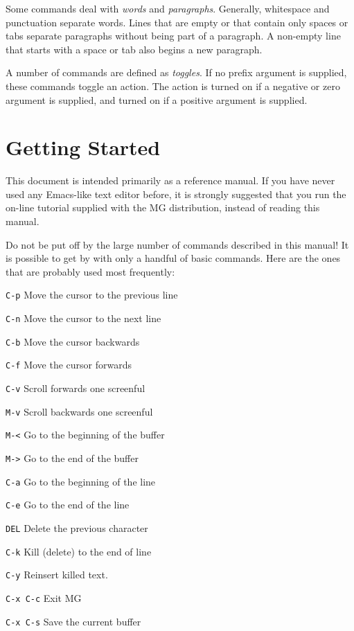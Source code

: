 Some commands deal with {\em words\/} and {\em paragraphs\/}.
Generally, whitespace and punctuation separate words.  Lines that are
empty or that contain only spaces or tabs separate paragraphs without
being part of a paragraph.  A non-empty line that starts with a space
or tab also begins a new paragraph. 

A number of commands are defined as {\em toggles\/}.  If no prefix argument
is supplied, these commands toggle an action.  The action is turned on if a 
negative or zero argument is supplied, and turned on if a positive argument
is supplied.

\section{Getting Started}

This document is intended primarily as a reference manual.  If you
have never used any Emacs-like text editor before, it is strongly
suggested that you run the on-line tutorial supplied with the MG
distribution, instead of reading this manual.

Do not be put off by the large number of commands described in this
manual!  It is possible to get by with only a handful of basic commands.
Here are the ones that are probably used most frequently:

\begin{define}{\hspace{1in}}
\item[{\tt C-p}\hfill] Move the cursor to the previous line
\item[{\tt C-n}\hfill] Move the cursor to the next line
\item[{\tt C-b}\hfill] Move the cursor backwards
\item[{\tt C-f}\hfill] Move the cursor forwards
\item[{\tt C-v}\hfill] Scroll forwards one screenful
\item[{\tt M-v}\hfill] Scroll backwards one screenful
\item[{\tt M-<}\hfill] Go to the beginning of the buffer
\item[{\tt M->}\hfill] Go to the end of the buffer
\item[{\tt C-a}\hfill] Go to the beginning of the line
\item[{\tt C-e}\hfill] Go to the end of the line
\item[{\tt DEL}\hfill] Delete the previous character
\item[{\tt C-k}\hfill] Kill (delete) to the end of line
\item[{\tt C-y}\hfill] Reinsert killed text.
\item[{\tt C-x C-c}\hfill] Exit MG
\item[{\tt C-x C-s}\hfill] Save the current buffer
\end{define}

